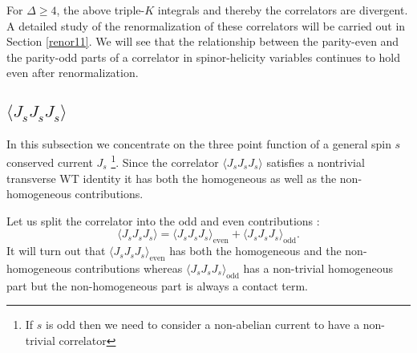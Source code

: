 \documentclass[a4paper,11pt]{article}
\begin{document}
For $\Delta \ge 4$, the above triple-$K$ integrals and thereby the correlators are divergent. A detailed study of the renormalization of these correlators will be carried out in Section \ref{renor11}. We will see that the relationship between the parity-even and the parity-odd parts of a correlator in spinor-helicity variables continues to hold even after renormalization.




\subsection{$\langle J_s J_s J_s\rangle$}
In this subsection we concentrate on the three point function of a general spin $s$ conserved current $J_s$ \footnote{If $s$ is odd then we need to consider a  non-abelian current to have a non-trivial correlator}. Since the correlator $\langle J_s J_s J_s\rangle$ satisfies a nontrivial transverse WT identity it has both the homogeneous as well as the non-homogeneous contributions. 

Let us split the correlator into the odd and even contributions :
$$\langle J_s J_s J_s\rangle=\langle J_s J_s J_s\rangle_{\text{even}}+\langle J_s J_s J_s\rangle_{\text{odd}}.$$ It will turn out that $\langle J_s J_s J_s\rangle_{\text{even}}$ has both the homogeneous and the non-homogeneous contributions whereas $\langle J_s J_s J_s\rangle_{\text{odd}}$ has a non-trivial homogeneous part but the non-homogeneous part is always a contact term. 
\end{document}
